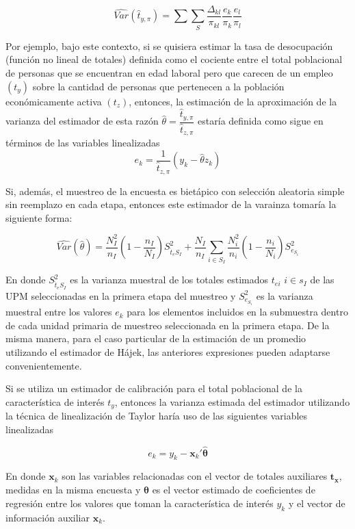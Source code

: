 \documentclass[
  10pt,
  spanish,
]{book}
\begin{document}
\[
    \widehat{Var}(\hat{t}_{y,\pi})=\sum\sum_S \dfrac{\Delta_{kl}}{\pi_{kl}}\frac{e_k}{\pi_k}\frac{e_l}{\pi_l}
\]

Por ejemplo, bajo este contexto, si se quisiera estimar la tasa de desocupación (función no lineal de totales) definida como el cociente entre el total poblacional de personas que se encuentran en edad laboral pero que carecen de un empleo \(({t}_{y})\) sobre la cantidad de personas que pertenecen a la población económicamente activa \(({t}_{z})\), entonces, la estimación de la aproximación de la varianza del estimador de esta razón \(\hat{\theta}=\dfrac{\hat{t}_{y,\pi}}{\hat{t}_{z,\pi}}\) estaría definida como sigue en términos de las variables linealizadas
\[
e_k=\dfrac{1}{\hat{t}_{z,\pi}}(y_k-\hat{\theta}z_k)
\]

Si, además, el muestreo de la encuesta es bietápico con selección aleatoria simple sin reemplazo en cada etapa, entonces este estimador de la varainza tomaría la siguiente forma:

\[
\widehat{Var}(\hat{\theta})=\frac{N_{I}^2}{n_{I}}\left(1-\frac{n_{I}}{N_{I}}\right)S^2_{\hat{t}_{e}S_I}+
\frac{N_{I}}{n_{I}}\sum_{i\in S_{I}}\frac{N_i^2}{n_i}\left(1-\frac{n_i}{N_i}\right)S^2_{e_{S_i}}
\]

En donde \(S^2_{\hat{t}_{e}S_I}\) es la varianza muestral de los totales estimados \(t_{ei}\) \(i\in s_I\) de las UPM seleccionadas en la primera etapa del muestreo y \(S^2_{e_{S_i}}\) es la varianza muestral entre los valores \(e_k\) para los elementos incluidos en la submuestra dentro de cada unidad primaria de muestreo seleccionada en la primera etapa.
De la misma manera, para el caso particular de la estimación de un promedio utilizando el estimador de Hájek, las anteriores expresiones pueden adaptarse convenientemente.

Si se utiliza un estimador de calibración para el total poblacional de la característica de interés \(t_y\), entonces la varianza estimada del estimador utilizando la técnica de linealización de Taylor haría uso de las siguientes variables linealizadas

\[
e_k=y_k-\mathbf{x}_k'\mathbf{\hat{\theta}}
\]

En donde \(\mathbf{x}_k\) son las variables relacionadas con el vector de totales auxiliares \(\mathbf{t}_{\mathbf{x}}\), medidas en la misma encuesta y \(\mathbf{\hat{\theta}}\) es el vector estimado de coeficientes de regresión entre los valores que toman la característica de interés \(y_k\) y el vector de información auxiliar \(\mathbf{x}_k\).
\end{document}
